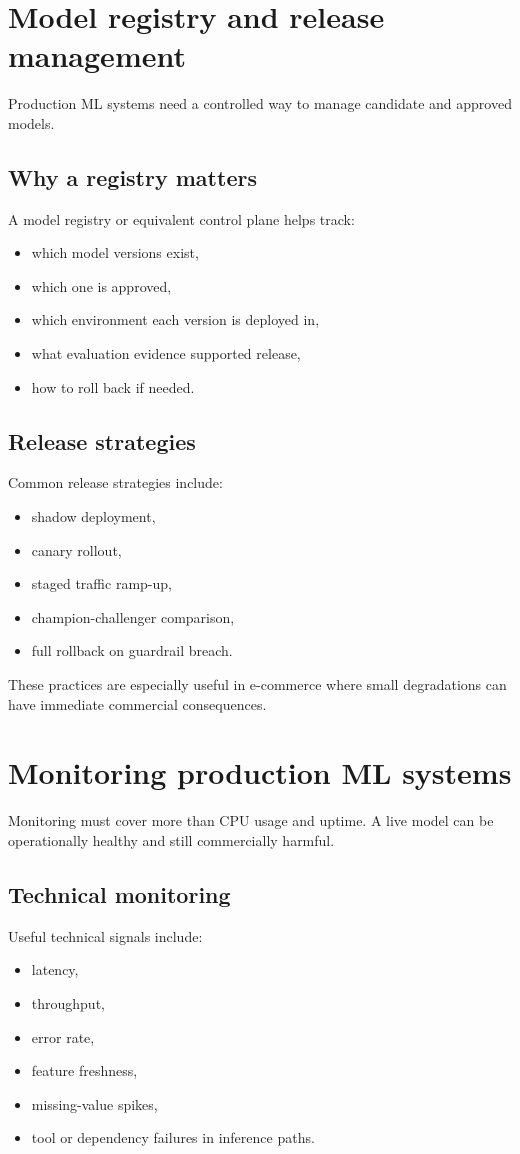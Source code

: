 \section{Model registry and release management}
Production ML systems need a controlled way to manage candidate and approved models.

\subsection{Why a registry matters}
A model registry or equivalent control plane helps track:
\begin{itemize}
  \item which model versions exist,
  \item which one is approved,
  \item which environment each version is deployed in,
  \item what evaluation evidence supported release,
  \item how to roll back if needed.
\end{itemize}

\subsection{Release strategies}
Common release strategies include:
\begin{itemize}
  \item shadow deployment,
  \item canary rollout,
  \item staged traffic ramp-up,
  \item champion-challenger comparison,
  \item full rollback on guardrail breach.
\end{itemize}

These practices are especially useful in e-commerce where small degradations can have immediate commercial consequences.

\section{Monitoring production ML systems}
Monitoring must cover more than CPU usage and uptime.
A live model can be operationally healthy and still commercially harmful.

\subsection{Technical monitoring}
Useful technical signals include:
\begin{itemize}
  \item latency,
  \item throughput,
  \item error rate,
  \item feature freshness,
  \item missing-value spikes,
  \item tool or dependency failures in inference paths.
\end{itemize}

